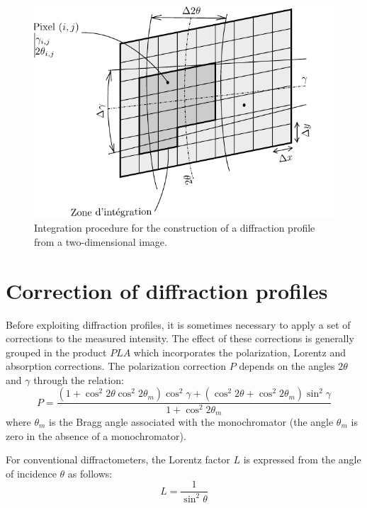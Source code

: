 \documentclass[french,a4paper]{report}
\begin{document}
\begin{figure}
\centering
\includegraphics{figures/detecteur.pdf}
\caption{Integration procedure for the construction of a diffraction profile from a two-dimensional image.}
\label{fig_detecteur}
\end{figure}

\section{Correction of diffraction profiles}

Before exploiting diffraction profiles, it is sometimes necessary to apply a set of corrections to the measured intensity. The effect of these corrections is generally grouped in the product $PLA$ which incorporates the polarization, Lorentz and absorption corrections. The polarization correction $P$ depends on the angles $2 \theta$ and $\gamma$ through the relation:
\begin{equation}
P = \frac{\left( 1+\cos^2  2 \theta  \cos^2  2 \theta_m  \right) \cos^2 \gamma +\left( \cos^2  2 \theta  + \cos^2  2 \theta_m  \right) \sin^2 \gamma }{1+\cos^2  2 \theta_m }
\end{equation}
where $\theta_m$ is the Bragg angle associated with the monochromator (the angle $\theta_m$ is zero in the absence of a monochromator).

For conventional diffractometers, the Lorentz factor $L$ is expressed from the angle of incidence $\theta$ as follows:
\begin{equation}
L = \frac{1}{ \sin^2  \theta  }
\end{equation}
\end{document}
